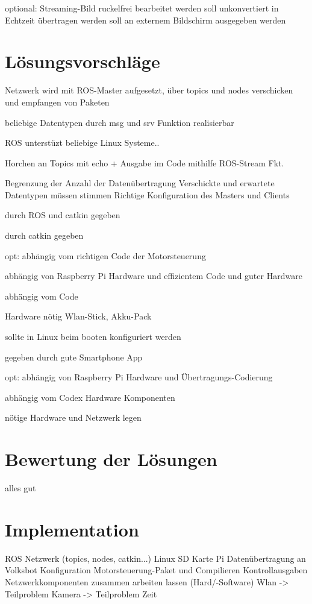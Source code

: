 \documentclass[12pt]{article}
\begin{document}
optional:
Streaming-Bild ruckelfrei bearbeitet werden
soll unkonvertiert in Echtzeit übertragen werden
soll an externem Bildschirm ausgegeben werden

\section{Lösungsvorschläge}

Netzwerk wird mit ROS-Master aufgesetzt, über topics und nodes
verschicken und empfangen von Paketen 

beliebige Datentypen durch msg und srv Funktion realisierbar

ROS unterstüzt beliebige Linux Systeme..

Horchen an Topics mit echo + Ausgabe im Code mithilfe ROS-Stream Fkt.

Begrenzung der Anzahl der Datenübertragung
Verschickte und erwartete Datentypen müssen stimmen
Richtige Konfiguration des Masters und Clients

durch ROS und catkin gegeben 

durch catkin gegeben

opt:
abhängig vom richtigen Code der Motorsteuerung

abhängig von Raspberry Pi Hardware und effizientem Code und
guter Hardware

abhängig vom Code

Hardware nötig Wlan-Stick, Akku-Pack 

sollte in Linux beim booten konfiguriert werden

gegeben durch gute Smartphone App

opt:
abhängig von Raspberry Pi Hardware und Übertragungs-Codierung

abhängig vom Codex Hardware Komponenten

nötige Hardware und Netzwerk legen

\section{Bewertung der Lösungen}

alles gut

\section{Implementation}

ROS Netzwerk (topics, nodes, catkin...)
Linux SD Karte Pi
Datenübertragung an Volksbot
Konfiguration Motorsteuerung-Paket und Compilieren
Kontrollausgaben 
Netzwerkkomponenten zusammen arbeiten lassen (Hard/-Software)
Wlan -> Teilproblem
Kamera -> Teilproblem Zeit
\end{document}
